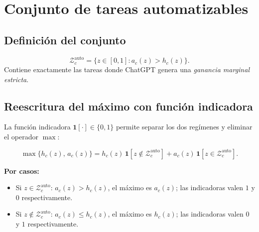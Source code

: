 \documentclass[11pt, a4paper]{article}
\newcommand{\ind}[1]{\mathbf{1}\!\left[#1\right]}
\begin{document}
\section{Conjunto de tareas automatizables}

\subsection{Definici\'on del conjunto}

\begin{demobox}
\begin{equation}
  \mathcal{Z}^{\mathrm{auto}}_c = \bigl\{z \in [0,1] : a_c(z) > h_c(z)\bigr\}.
\end{equation}
Contiene exactamente las tareas donde ChatGPT genera una \emph{ganancia marginal estricta}.
\end{demobox}

\subsection{Reescritura del m\'aximo con funci\'on indicadora}

La funci\'on indicadora $\ind{\cdot} \in \{0,1\}$ permite separar los dos reg\'imenes y eliminar el operador $\max$:

\begin{demobox}
\begin{equation}
  \max\!\bigl\{h_c(z),\,a_c(z)\bigr\}
  = h_c(z)\,\ind{z \notin \mathcal{Z}^{\mathrm{auto}}_c}
  + a_c(z)\,\ind{z \in \mathcal{Z}^{\mathrm{auto}}_c}.
\end{equation}

\textbf{Por casos:}
\begin{itemize}[leftmargin=1.4em, itemsep=2pt]
  \item Si $z \in \mathcal{Z}^{\mathrm{auto}}_c$: $a_c(z)>h_c(z)$, el m\'aximo es $a_c(z)$;
        las indicadoras valen $1$ y $0$ respectivamente. \checkmark
  \item Si $z \notin \mathcal{Z}^{\mathrm{auto}}_c$: $a_c(z)\le h_c(z)$, el m\'aximo es $h_c(z)$;
        las indicadoras valen $0$ y $1$ respectivamente. \checkmark
\end{itemize}
\end{demobox}
\end{document}
